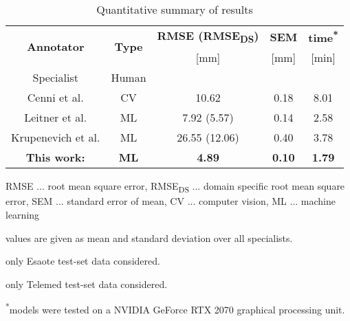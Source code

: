 \documentclass[journal,twoside,web]{ieeecolor}
\begin{document}
 \setlength{\tabcolsep}{0.32em}
\begin{table}[t!]
\caption{Quantitative summary of results}
\label{tab:Results}
\begin{center}
    \vspace{-0.2cm} 
    \renewcommand{\arraystretch}{1.20}
    \begin{tabular}{ccccc}
        \toprule
           \multirow{2}{*}{\textbf{Annotator}}
            &\multirow{2}{*}{\textbf{Type}}
            &\textbf{RMSE (RMSE\textsubscript{DS})}    
            &\textbf{SEM}
            &\textbf{time\textsuperscript{*}}\\
&
            &[mm]
            &[mm]
            &[min]\\
        \midrule
            \cellcolor{Gray}Specialist\textsuperscript{} 
            &\cellcolor{Gray}Human
            &\cellcolor{Gray}   
            &\cellcolor{Gray}
            &\cellcolor{Gray}\\
Cenni et al. \cite{j:Cenni2019} 
            &CV
            &10.62
            &0.18
            &8.01\\
Leitner et al. \cite{c:LeitnerJarolim2020}    
            &ML
            &7.92 (5.57\textsuperscript{})
            &0.14
            &2.58\\
Krupenevich et al. \cite{j:Krupenevich2021}    
            &ML
            &26.55 (12.06\textsuperscript{})
            &0.40
            &3.78\\
\textbf{This work:} 
            &\textbf{ML}
            &\textbf{4.89}
            &\textbf{0.10}
            &\textbf{1.79}\\
\bottomrule
\end{tabular}
    \begin{tablenotes}\footnotesize
    \item RMSE ... root mean square error, RMSE\textsubscript{DS} ... domain specific root mean square error, SEM ... standard error of mean, CV ... computer vision, ML ... machine learning
    \item \textsuperscript{}values are given as mean and standard deviation over all  specialists.
    \item \textsuperscript{} only Esaote test-set data considered.
    \item \textsuperscript{} only Telemed test-set data considered.
    \item \textsuperscript{*}models were tested on a NVIDIA GeForce RTX 2070 graphical processing unit.
    \end{tablenotes}
\end{center}
\vspace{-0.3cm}
\end{table}
\vspace{0.5cm}
 
\end{document}
